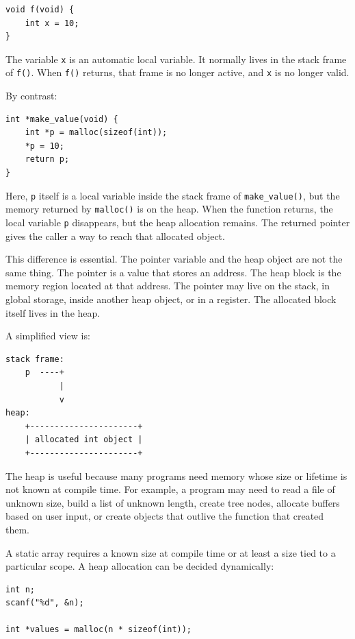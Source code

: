 \begin{verbatim}
void f(void) {
    int x = 10;
}
\end{verbatim}

The variable \texttt{x} is an automatic local variable. It normally lives in the stack frame of \texttt{f()}. When \texttt{f()} returns, that frame is no longer active, and \texttt{x} is no longer valid.

By contrast:

\begin{verbatim}
int *make_value(void) {
    int *p = malloc(sizeof(int));
    *p = 10;
    return p;
}
\end{verbatim}

Here, \texttt{p} itself is a local variable inside the stack frame of \texttt{make\_value()}, but the memory returned by \texttt{malloc()} is on the heap. When the function returns, the local variable \texttt{p} disappears, but the heap allocation remains. The returned pointer gives the caller a way to reach that allocated object.

This difference is essential. The pointer variable and the heap object are not the same thing. The pointer is a value that stores an address. The heap block is the memory region located at that address. The pointer may live on the stack, in global storage, inside another heap object, or in a register. The allocated block itself lives in the heap.

A simplified view is:

\begin{verbatim}
stack frame:
    p  ----+
           |
           v
heap:
    +----------------------+
    | allocated int object |
    +----------------------+
\end{verbatim}

The heap is useful because many programs need memory whose size or lifetime is not known at compile time. For example, a program may need to read a file of unknown size, build a list of unknown length, create tree nodes, allocate buffers based on user input, or create objects that outlive the function that created them.

A static array requires a known size at compile time or at least a size tied to a particular scope. A heap allocation can be decided dynamically:

\begin{verbatim}
int n;
scanf("%d", &n);

int *values = malloc(n * sizeof(int));
\end{verbatim}


